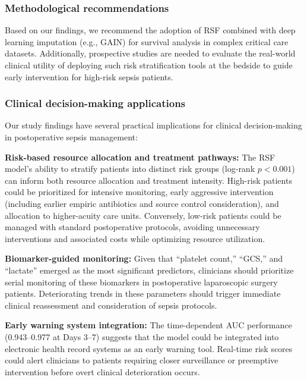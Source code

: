 \documentclass[pdflatex,sn-mathphys-num]{sn-jnl}%
\theoremstyle{thmstyleone}%
\theoremstyle{thmstyletwo}%
\theoremstyle{thmstylethree}%
\begin{document}
\subsubsection{Methodological recommendations}
Based on our findings, we recommend the adoption of RSF combined with deep learning imputation (e.g., GAIN) for survival analysis in complex critical care datasets. Additionally, prospective studies are needed to evaluate the real-world clinical utility of deploying such risk stratification tools at the bedside to guide early intervention for high-risk sepsis patients.

\subsubsection{Clinical decision-making applications}
Our study findings have several practical implications for clinical decision-making in postoperative sepsis management:

\textbf{Risk-based resource allocation and treatment pathways:} The RSF model's ability to stratify patients into distinct risk groups (log-rank $p < 0.001$) can inform both resource allocation and treatment intensity. High-risk patients could be prioritized for intensive monitoring, early aggressive intervention (including earlier empiric antibiotics and source control consideration), and allocation to higher-acuity care units. Conversely, low-risk patients could be managed with standard postoperative protocols, avoiding unnecessary interventions and associated costs while optimizing resource utilization.

\textbf{Biomarker-guided monitoring:} Given that ``platelet count,'' ``GCS,'' and ``lactate'' emerged as the most significant predictors, clinicians should prioritize serial monitoring of these biomarkers in postoperative laparoscopic surgery patients. Deteriorating trends in these parameters should trigger immediate clinical reassessment and consideration of sepsis protocols.

\textbf{Early warning system integration:} The time-dependent AUC performance (0.943--0.977 at Days 3--7) suggests that the model could be integrated into electronic health record systems as an early warning tool. Real-time risk scores could alert clinicians to patients requiring closer surveillance or preemptive intervention before overt clinical deterioration occurs. 
\end{document}
